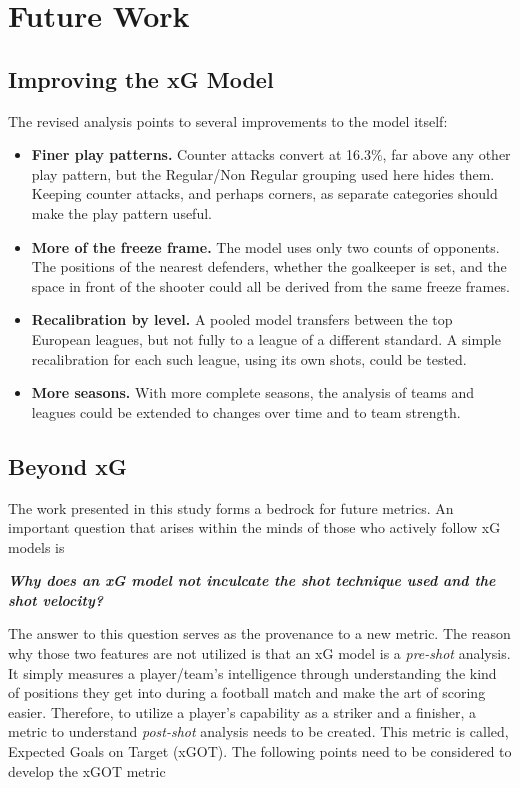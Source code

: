 \chapter{Future Work}\label{future}

\section{Improving the xG Model}
The revised analysis points to several improvements to the model itself:
\begin{itemize}
    \item \textbf{Finer play patterns.} Counter attacks convert at 16.3\%, far above any other play pattern, but the Regular/Non Regular grouping used here hides them. Keeping counter attacks, and perhaps corners, as separate categories should make the play pattern useful.
    \item \textbf{More of the freeze frame.} The model uses only two counts of opponents. The positions of the nearest defenders, whether the goalkeeper is set, and the space in front of the shooter could all be derived from the same freeze frames.
    \item \textbf{Recalibration by level.} A pooled model transfers between the top European leagues, but not fully to a league of a different standard. A simple recalibration for each such league, using its own shots, could be tested.
    \item \textbf{More seasons.} With more complete seasons, the analysis of teams and leagues could be extended to changes over time and to team strength.
\end{itemize}

\section{Beyond xG}
The work presented in this study forms a bedrock for future metrics. An important question that arises within the minds of those who actively follow xG models is\\

\begin{center}
\textit{\textbf{Why does an xG model not inculcate the shot technique used and the shot velocity?}}
\end{center}

The answer to this question serves as the provenance to a new metric. The reason why those two features are not utilized is that an xG model is a \textit{pre-shot} analysis. It simply measures a player/team's intelligence through understanding the kind of positions they get into during a football match and make the art of scoring easier. Therefore, to utilize a player's capability as a striker and a finisher, a metric to understand \textit{post-shot} analysis needs to be created. This metric is called, Expected Goals on Target (xGOT). The following points need to be considered to develop the xGOT metric

